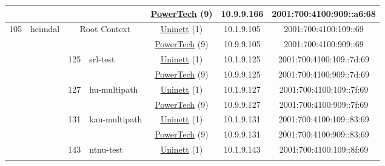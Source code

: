 \begin{small}
\begin{center}
\begin{longtable}{|c|c|c|c|c|c|c|c|}
  &  &  &  & \multicolumn{2}{|c|}{\tiny{\href{http://www.powertech.no}{PowerTech} (9)}} & \tiny{10.9.9.166} & \tiny{2001:700:4100:909::a6:68} \\ \hline
 \multirow{16}{*}{\tiny{105}} & \multicolumn{1}{|l|}{\multirow{16}{*}{\tiny{heimdal}}} & \multicolumn{2}{|c|}{\multirow{2}{*}{\tiny{Root Context}}} & \multicolumn{2}{|c|}{\tiny{\href{https://www.uninett.no}{Uninett} (1)}} & \tiny{10.1.9.105} & \tiny{2001:700:4100:109::69} \\* \cline{5-5}\cline{6-6}\cline{7-7}\cline{8-8}
  &  & \multicolumn{2}{|c|}{} & \multicolumn{2}{|c|}{\tiny{\href{http://www.powertech.no}{PowerTech} (9)}} & \tiny{10.9.9.105} & \tiny{2001:700:4100:909::69} \\* \cline{3-3}\cline{4-4}\cline{5-5}\cline{6-6}\cline{7-7}\cline{8-8}
  &  & \multirow{2}{*}{\tiny{125}} & \multicolumn{1}{|l|}{\multirow{2}{*}{\tiny{srl-test}}} & \multicolumn{2}{|c|}{\tiny{\href{https://www.uninett.no}{Uninett} (1)}} & \tiny{10.1.9.125} & \tiny{2001:700:4100:109::7d:69} \\* \cline{5-5}\cline{6-6}\cline{7-7}\cline{8-8}
  &  &  &  & \multicolumn{2}{|c|}{\tiny{\href{http://www.powertech.no}{PowerTech} (9)}} & \tiny{10.9.9.125} & \tiny{2001:700:4100:909::7d:69} \\* \cline{3-3}\cline{4-4}\cline{5-5}\cline{6-6}\cline{7-7}\cline{8-8}
  &  & \multirow{2}{*}{\tiny{127}} & \multicolumn{1}{|l|}{\multirow{2}{*}{\tiny{hu-multipath}}} & \multicolumn{2}{|c|}{\tiny{\href{https://www.uninett.no}{Uninett} (1)}} & \tiny{10.1.9.127} & \tiny{2001:700:4100:109::7f:69} \\* \cline{5-5}\cline{6-6}\cline{7-7}\cline{8-8}
  &  &  &  & \multicolumn{2}{|c|}{\tiny{\href{http://www.powertech.no}{PowerTech} (9)}} & \tiny{10.9.9.127} & \tiny{2001:700:4100:909::7f:69} \\* \cline{3-3}\cline{4-4}\cline{5-5}\cline{6-6}\cline{7-7}\cline{8-8}
  &  & \multirow{2}{*}{\tiny{131}} & \multicolumn{1}{|l|}{\multirow{2}{*}{\tiny{kau-multipath}}} & \multicolumn{2}{|c|}{\tiny{\href{https://www.uninett.no}{Uninett} (1)}} & \tiny{10.1.9.131} & \tiny{2001:700:4100:109::83:69} \\* \cline{5-5}\cline{6-6}\cline{7-7}\cline{8-8}
  &  &  &  & \multicolumn{2}{|c|}{\tiny{\href{http://www.powertech.no}{PowerTech} (9)}} & \tiny{10.9.9.131} & \tiny{2001:700:4100:909::83:69} \\* \cline{3-3}\cline{4-4}\cline{5-5}\cline{6-6}\cline{7-7}\cline{8-8}
  &  & \multirow{2}{*}{\tiny{143}} & \multicolumn{1}{|l|}{\multirow{2}{*}{\tiny{ntnu-test}}} & \multicolumn{2}{|c|}{\tiny{\href{https://www.uninett.no}{Uninett} (1)}} & \tiny{10.1.9.143} & \tiny{2001:700:4100:109::8f:69} \\* \cline{5-5}\cline{6-6}\cline{7-7}\cline{8-8}

\end{longtable}
\end{center}
\end{small}
